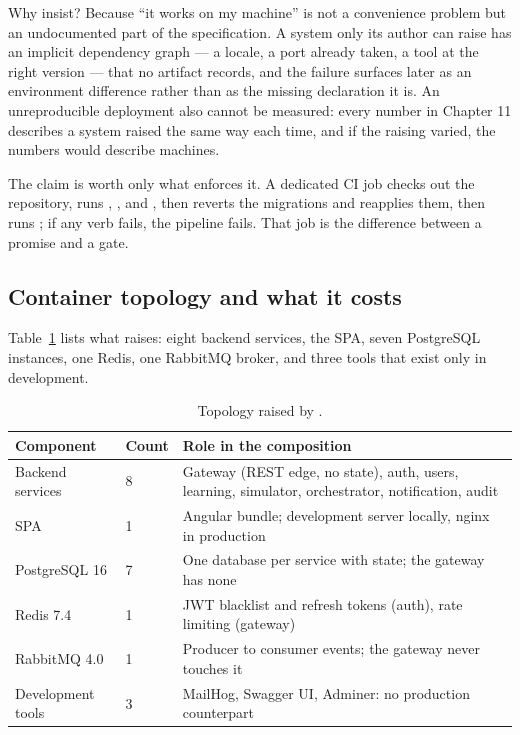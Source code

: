 Why insist? Because \enquote{it works on my machine} is not a convenience problem but an undocumented
part of the specification. A system only its author can raise has an implicit dependency graph — a
locale, a port already taken, a tool at the right version — that no artifact records, and the failure
surfaces later as an environment difference rather than as the missing declaration it is. An
unreproducible deployment also cannot be measured: every number in Chapter 11 describes a system
raised the same way each time, and if the raising varied, the numbers would describe machines.

The claim is worth only what enforces it. A dedicated CI job checks out the repository, runs
, , and , then reverts the migrations and reapplies
them, then runs ; if any verb fails, the pipeline fails. That job is the difference
between a promise and a gate.

\subsection{Container topology and what it costs}

Table~\ref{tab:topology} lists what  raises: eight backend services, the SPA, seven
PostgreSQL instances, one Redis, one RabbitMQ broker, and three tools that exist only in development.

\begin{table}[htbp]
  \centering
  \begin{tabular}{llp{7.4cm}}
    \hline
    Component & Count & Role in the composition \\
    \hline
    Backend services & 8 & Gateway (REST edge, no state), auth, users, learning, simulator, orchestrator, notification, audit \\
    SPA & 1 & Angular bundle; development server locally, nginx in production \\
    PostgreSQL 16 & 7 & One database per service with state; the gateway has none \\
    Redis 7.4 & 1 & JWT blacklist and refresh tokens (auth), rate limiting (gateway) \\
    RabbitMQ 4.0 & 1 & Producer to consumer events; the gateway never touches it \\
    Development tools & 3 & MailHog, Swagger UI, Adminer: no production counterpart \\
    \hline
  \end{tabular}
  \caption{Topology raised by .}
  \label{tab:topology}
\end{table}

